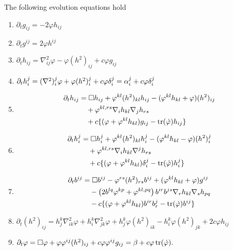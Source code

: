 \documentclass{amsart}
\begin{document}
\begin{lemma}
\label{lem:evolution}
The following evolution equations hold
\begin{enumerate}
\item \label{eq:delt_metric} $\partial_tg_{ij} = -2\varphi h_{ij}$
\item \label{eq:delt_inversemetric} $\partial_t g^{ij} = 2\varphi h^{ij}$
\item \label{eq:delt_sff} $\partial_t h_{ij} = \nabla^2_{ij} \varphi - \varphi(h^2)_{ij} + c \varphi g_{ij}$
\item \label{eq:delt_weingarten} $\partial_t h_i^j = (\nabla^2)^j_i\varphi + \varphi(h^2)_i^j + c \varphi\delta_i^j = \alpha^j_i + c \varphi\delta_i^j$
\item \label{eq:delt_sff_box} \begin{align*}
\partial_t h_{ij} &= \Box h_{ij} + \varphi^{kl} (h^2)_{kl} h_{ij} - (\varphi^{kl}h_{kl} + \varphi) (h^2)_{ij} \\
& \quad + \varphi^{kl,rs}\nabla_i h_{kl}\nabla_j h_{rs} \\
& \quad + c \{(\varphi + \varphi^{kl}h_{kl}) g_{ij} - \operatorname{tr}(\dot{\varphi}) h_{ij}\}
\end{align*}
\item \label{eq:delt_weingarten_box} \begin{align*}
\partial_t h_i^j &= \Box h_i^j + \varphi^{kl} (h^2)_{kl} h_i^j - (\varphi^{kl}h_{kl} - \varphi) (h^2)_i^j \\
& \quad + \varphi^{kl,rs}\nabla_i h_{kl}\nabla^j h_{rs} \\
& \quad + c \{(\varphi + \varphi^{kl}h_{kl}) \delta_i^j - \operatorname{tr}(\dot{\varphi}) h_i^j\}
\end{align*}
\item \label{eq:delt_inversesff} \begin{align*}
\partial_t b^{ij} &= \Box b^{ij} - \varphi^{rs} (h^2)_{rs} b^{ij} + (\varphi^{kl}h_{kl} + \varphi) g^{ij} \\
& \quad - \left(2b^{lq}\varphi^{kp} + \varphi^{kl,pq}\right) b^{ir}b^{js} \nabla_r h_{kl} \nabla_s h_{pq} \\
& \quad - c \{(\varphi + \varphi^{kl}h_{kl}) b^{ir}b^{j}_{r} - \operatorname{tr}(\dot{\varphi}) b^{ij}\}
\end{align*}
\item \label{eq:delt_squaredsff} $\partial_t (h^2)_{ij} = h^k_j \nabla^2_{ik} \varphi + h^k_i \nabla^2_{jk} \varphi + h^k_j \varphi(h^2)_{ik} - h^k_i \varphi(h^2)_{jk} + 2c\varphi h_{ij}$
\item \label{eq:delt_speed} $\partial_t \varphi = \Box \varphi + \varphi\varphi^{ij}(h^2)_{ij} + c \varphi\varphi^{ij}g_{ij} = \beta + c\varphi\operatorname{tr}(\dot{\varphi}).$
\end{enumerate}
\end{lemma}
\end{document}
